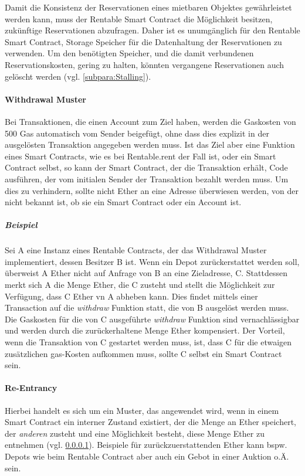 Damit die Konsistenz der Reservationen eines mietbaren Objektes gewährleistet werden kann, muss der Rentable Smart Contract die Möglichkeit besitzen, zukünftige Reservationen abzufragen. Daher ist es unumgänglich für den Rentable Smart Contract, Storage Speicher für die Datenhaltung der Reservationen zu verwenden. Um den benötigten Speicher, und die damit verbundenen Reservationskosten, gering zu halten, könnten vergangene Reservationen auch gelöscht werden (vgl. \ref{subpara:Stalling}).

\paragraph{Withdrawal Muster}
\label{para:Withdrawal_Muster}
Bei Transaktionen, die einen Account zum Ziel haben, werden die Gaskosten von 500 Gas automatisch vom Sender beigefügt, ohne dass dies explizit in der ausgelösten Transaktion angegeben werden muss. Ist das Ziel aber eine Funktion eines Smart Contracts, wie es bei Rentable.rent der Fall ist, oder ein Smart Contract selbst, so kann der Smart Contract, der die Transaktion erhält, Code ausführen, der vom initialen Sender der Transaktion bezahlt werden muss. Um dies zu verhindern, sollte nicht Ether an eine Adresse überwiesen werden, von der nicht bekannt ist, ob sie ein Smart Contract oder ein Account ist.\cite[Wiki/Contracts and Transactions]{go-ethereum}\cite{cryptocompare.com/gas}\cite[FAQ/What is the deal with...]{solidity.readthedocs.io}

\subparagraph{Beispiel}
Sei A eine Instanz eines Rentable Contracts, der das Withdrawal Muster implementiert, dessen Besitzer B ist. Wenn ein Depot zurückerstattet werden soll, überweist A Ether nicht auf Anfrage von B an eine Zieladresse, C. Stattdessen merkt sich A die Menge Ether, die C zusteht und stellt die Möglichkeit zur Verfügung, dass C Ether vn A abheben kann. Dies findet mittels einer Transaction auf die \emph{withdraw} Funktion statt, die von B ausgelöst werden muss. Die Gaskosten für die von C ausgeführte \emph{withdraw} Funktion sind vernachlässigbar und werden durch die zurückerhaltene Menge Ether kompensiert. Der Vorteil, wenn die Transaktion von C gestartet werden muss, ist, dass C für die etwaigen zusätzlichen gas-Kosten aufkommen muss, sollte C selbst ein Smart Contract sein.

\paragraph{Re-Entrancy}
Hierbei handelt es sich um ein Muster, das angewendet wird, wenn in einem Smart Contract ein interner Zustand existiert, der die Menge an Ether speichert, der \emph{anderen} zusteht und eine Möglichkeit besteht, diese Menge Ether zu entnehmen (vgl. \ref{para:Withdrawal_Muster}). Beispiele für zurückzuerstattenden Ether kann bspw. Depots wie beim Rentable Contract aber auch ein Gebot in einer Auktion o.Ä. sein.\cite[Security Considerations/Re-Entrancy]{solidity.readthedocs.io}

